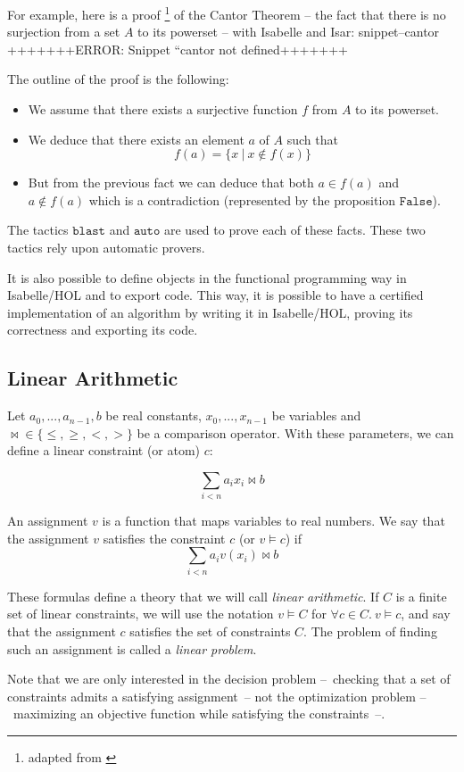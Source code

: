\documentclass{article}
\newcommand{\Snippet}[1]{%
  \ifcsname snippet--#1\endcsname{\csname snippet--#1\endcsname}%
  \else+++++++ERROR: Snippet ``#1 not defined+++++++ \fi}
\begin{document}
For example, here is a proof
\footnote{adapted from \cite[Section 5.1]{ConcreteSemantics}}
of the Cantor Theorem -- the fact that there is no surjection from a set $A$ to
its powerset -- with Isabelle and Isar:
\Snippet{cantor}

The outline of the proof is the following:
\begin{itemize}
  \item We assume that there exists a surjective function $f$ from $A$ to
    its powerset.
  \item We deduce that there exists an element $a$ of $A$ such that
    $$f(a) = \{x~|~x \notin f(x)\}$$
  \item But from the previous fact we can deduce that both $a \in f(a)$ and $a
    \notin f(a)$ which is a contradiction (represented by the proposition
    $\mathtt{False}$).
\end{itemize}
The tactics $\mathtt{blast}$ and $\mathtt{auto}$
are used to prove each of these facts. These two tactics rely upon automatic
provers.

It is also possible to define objects in the functional programming way in
Isabelle/HOL and to export code. This way, it is possible to have a certified
implementation of an algorithm by writing it in Isabelle/HOL, proving its
correctness and exporting its code.

\subsection{Linear Arithmetic}

Let $a_0, ..., a_{n-1}, b$ be real constants, $x_0, ..., x_{n-1}$ be
variables and ${\bowtie} \in \{\leqslant,\geqslant,<,>\}$ be a comparison
operator. With these parameters, we can define a linear constraint (or atom)
$c$:

$$\sum_{i < n} a_i x_i \bowtie b$$

An assignment $v$ is a function that maps variables to real numbers.
We say that the assignment $v$ satisfies the constraint $c$ (or $v \vDash c$)
if $$\sum_{i < n} a_i v(x_i) \bowtie b$$

These formulas define a theory that we will call \textit{linear arithmetic}.
If $C$ is a finite set of linear constraints,
we will use the notation $v \vDash C$ for $\forall c \in C.~v \vDash c$, and
say that the assignment $c$ satisfies the set of constraints $C$. The
problem of finding such an assignment is called a
\textit{linear problem}.

Note that we are only interested in the decision problem --~checking
that a set of constraints admits a satisfying assignment~-- not the
optimization problem --~maximizing an objective function while
satisfying the constraints~--.
\end{document}
